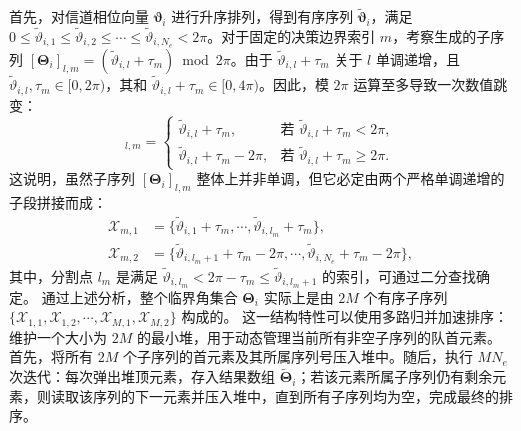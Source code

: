 首先，对信道相位向量 $\bm \vartheta_i$ 进行升序排列，得到有序序列 $\tilde{\bm \vartheta}_i$，满足 $0 \le \tilde\vartheta_{i,1} \le \tilde\vartheta_{i,2} \le \cdots \le \tilde\vartheta_{i,N_e} < 2\pi$。对于固定的决策边界索引 $m$，考察生成的子序列 $[\bm \Theta_i]_{l,m} = (\tilde\vartheta_{i,l} + \tau_m) \bmod 2\pi$。由于 $\tilde\vartheta_{i,l} + \tau_m$ 关于 $l$ 单调递增，且 $\tilde\vartheta_{i,l}, \tau_m \in [0, 2\pi)$，其和 $\tilde\vartheta_{i,l} + \tau_m \in [0, 4\pi)$。因此，模 $2\pi$ 运算至多导致一次数值跳变：
\begin{equation}
	[\bm \Theta_i]_{l,m} = 
	\begin{cases} 
		\tilde\vartheta_{i,l} + \tau_m, & \text{若 } \tilde\vartheta_{i,l} + \tau_m < 2\pi, \\ 
		\tilde\vartheta_{i,l} + \tau_m - 2\pi, & \text{若 } \tilde\vartheta_{i,l} + \tau_m \ge 2\pi. 
	\end{cases}
\end{equation}
这说明，虽然子序列 $[\bm \Theta_i]_{l,m}$ 整体上并非单调，但它必定由两个严格单调递增的子段拼接而成：
\begin{align}
	\mathcal{X}_{m,1} &= \{ \tilde\vartheta_{i,1}+\tau_m, \cdots, \tilde\vartheta_{i,l_m}+\tau_m \}, \\
	\mathcal{X}_{m,2} &= \{ \tilde\vartheta_{i,l_m+1}+\tau_m-2\pi, \cdots, \tilde\vartheta_{i,N_e}+\tau_m-2\pi \},
\end{align}
其中，分割点 $l_m$ 是满足 $\tilde\vartheta_{i,l_m} < 2\pi - \tau_m \le \tilde\vartheta_{i,l_m+1}$ 的索引，可通过二分查找确定。
通过上述分析，整个临界角集合 $\bm \Theta_i$ 实际上是由 $2M$ 个有序子序列 $\{\mathcal{X}_{1,1}, \mathcal{X}_{1,2}, \cdots, \mathcal{X}_{M,1}, \mathcal{X}_{M,2}\}$ 构成的。
这一结构特性可以使用多路归并加速排序：维护一个大小为 $2M$ 的最小堆，用于动态管理当前所有非空子序列的队首元素。首先，将所有 $2M$ 个子序列的首元素及其所属序列号压入堆中。随后，执行 $MN_e$ 次迭代：每次弹出堆顶元素，存入结果数组 $\tilde{\bm \Theta}_{i}$；若该元素所属子序列仍有剩余元素，则读取该序列的下一元素并压入堆中，直到所有子序列均为空，完成最终的排序。


